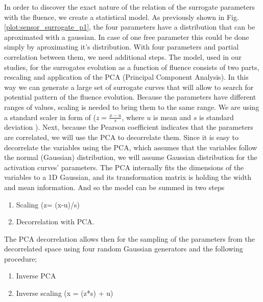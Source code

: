 In order to discover the exact nature of the relation of the surrogate parameters with the fluence, we create a statistical model.
As previously shown in Fig. \ref{plot:sensor_surrogate_p1}, the four parameters have a distribution that can be aproximated with a gaussian.
In case of one free parameter this could be done simply by aproximating it's distribution.
With four parameters and partial correlation between them, we need additional steps.
The model, used in our studies, for the surrogates evolution as a function of fluence consists of two parts, rescaling and application of the PCA (Principal Component Analysis). In this way we can generate a large set of surrogate curves that will allow to search for potential pattern of the fluence evolution.
Because the parameters have different ranges of values, scaling is needed to bring them to the same range. We are using a standard scaler in form of ($z = \frac{x - u}{s}$, where $u$ is mean and $s$ is standard deviation ).
Next, because the Pearson coefficient indicates that the parameters are correlated, we will use the PCA to decorrelate them.
Since it is easy to decorrelate the variables using the PCA, which assumes that the variables follow the normal (Gaussian) distribution, we will assume Gaussian distribution for the activation curves' parameters.
The PCA internally fits the dimensions of the variables to a 1D Gaussian, and its transformation matrix is holding the width and mean information.
And so the model can be summed in two steps

\begin{enumerate}[noitemsep]
\item Scaling (z= (x-u)/s)
\item Decorrelation with PCA.
\end{enumerate}

The PCA decorrelation allows then for the sampling of the parameters from the decorrelated space using four random Gaussian generators and the following procedure;

\begin{enumerate}[noitemsep]
\item Inverse PCA
\item Inverse scaling (x = (z*s) + u)
\end{enumerate}

